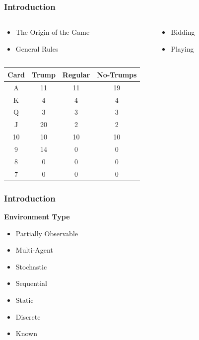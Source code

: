 \documentclass{beamer}
\begin{document}
\begin{frame}\frametitle{Introduction}
\begin{center}
    \begin{columns}
        \begin{column}{5cm}
        \begin{itemize}
        \item The Origin of the Game
        \item General Rules
        \end{itemize}
        \end{column}
        \begin{column}{2cm}
            \begin{itemize}
                \item Bidding
                \item Playing
            \end{itemize}
        \end{column}
    \end{columns}
    \vspace{15pt}
            \begin{tabular}{|c|c|c|c|}
                \hline
                \textbf{Card} & \textbf{Trump} & \textbf{Regular} & \textbf{No-Trumps}\\
                \hline
                A & 11 & 11 & 19\\
                \hline
                K & 4 & 4 & 4\\
                \hline
                Q & 3 & 3 & 3\\
                \hline
                J & 20 & 2 & 2\\
                \hline
                10 & 10 & 10 & 10\\
                \hline
                9 & 14 & 0 & 0\\
                \hline
                8 & 0 & 0 & 0\\
                \hline
                7 & 0 & 0 & 0\\
                \hline
            \end{tabular}

\end{center}
\end{frame}

\begin{frame}\frametitle{Introduction}
    \begin{center}
        \textbf{Environment Type}
    \end{center}
    \begin{itemize}
        \item Partially Observable
        \item Multi-Agent
        \item Stochastic
        \item Sequential
        \item Static
        \item Discrete
        \item Known
    \end{itemize}
\end{frame}
\end{document}
